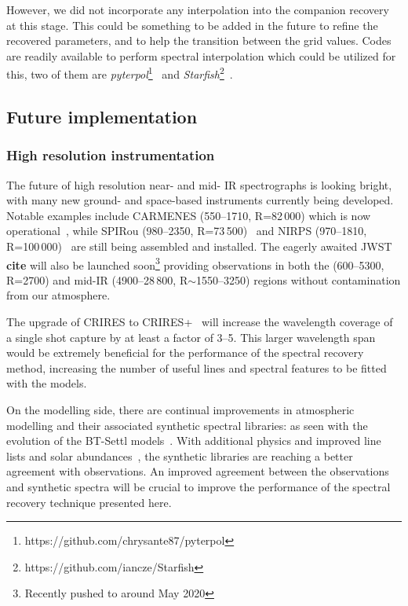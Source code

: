 However, we did not incorporate any interpolation into the companion recovery at this stage.
This could be something to be added in the future to refine the recovered parameters, and to help the transition between the grid \logg{} values.
Codes are readily available to perform spectral interpolation which could be utilized for this, two of them are \emph{pyterpol}\footnote{https://github.com/chrysante87/pyterpol}~\citet{nemravova_xtauri_2016} and \emph{Starfish}\footnote{https://github.com/iancze/Starfish}~\cite{czekala_constructing_2015}.


\subsection{Future implementation}
\label{subsec:future}
\subsubsection{High resolution instrumentation}
\label{subsubsec:highres}
The future of high resolution near- and mid- IR spectrographs is looking bright, with many new ground- and space-based instruments currently being developed.
Notable examples include CARMENES (550--1710\nm{},  R=82\,000) which is now operational~\citep{quirrenbach_carmenes_2014}, while SPIRou (980--2350\nm{},  R=73\,500)~\cite{artigau_spirou_2014} and NIRPS (970--1810\nm{}, R=100\,000)~\cite{bouchy_nearinfrared_2017} are still being assembled and installed.
The eagerly awaited {JWST} \textbf{cite} will also be launched soon\footnote{Recently pushed to around May 2020} providing observations in both the \nir{} (600--5300\nm{}, R=2700) and mid-IR (4900--28\,800\nm{}, R$\sim$1550--3250) regions without contamination from our atmosphere.

The upgrade of CRIRES to CRIRES+~\citep{dorn_crires_2016} will increase the wavelength coverage of a single shot capture by at least a factor of 3--5.
This larger wavelength span would be extremely beneficial for the \textchisquared{} performance of the spectral recovery method, increasing the number of useful lines and spectral features to be fitted with the models.

On the modelling side, there are continual improvements in atmospheric modelling and their associated synthetic spectral libraries: as seen with the evolution of the {BT-Settl} models~\cite{allard_btsettl_2013}.
With additional physics and improved line lists and solar abundances~\citep [e.g.][]{asplund_chemical_2009,caffau_solar_2011}, the synthetic libraries are reaching a better agreement with \nir{} observations.
An improved agreement between the \nir{} observations and synthetic spectra will be crucial to improve the performance of the spectral recovery technique presented here.

